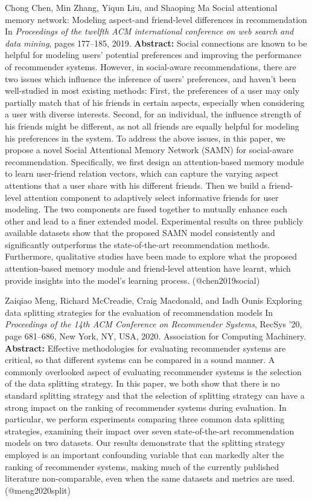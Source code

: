 \documentclass{article}
\begin{document}
\begin{thebibliography}{}
 Chong Chen, Min Zhang, Yiqun Liu, and Shaoping Ma \newblock Social attentional memory network: Modeling aspect-and friend-level differences in recommendation \newblock In {\em Proceedings of the twelfth ACM international conference on web search and data mining}, pages 177--185, 2019. \newblock \textbf{Abstract:} Social connections are known to be helpful for modeling users' potential preferences and improving the performance of recommender systems. However, in social-aware recommendations, there are two issues which influence the inference of users' preferences, and haven't been well-studied in most existing methods: First, the preferences of a user may only partially match that of his friends in certain aspects, especially when considering a user with diverse interests. Second, for an individual, the influence strength of his friends might be different, as not all friends are equally helpful for modeling his preferences in the system. To address the above issues, in this paper, we propose a novel Social Attentional Memory Network (SAMN) for social-aware recommendation. Specifically, we first design an attention-based memory module to learn user-friend relation vectors, which can capture the varying aspect attentions that a user share with his different friends. Then we build a friend-level attention component to adaptively select informative friends for user modeling. The two components are fused together to mutually enhance each other and lead to a finer extended model. Experimental results on three publicly available datasets show that the proposed SAMN model consistently and significantly outperforms the state-of-the-art recommendation methods. Furthermore, qualitative studies have been made to explore what the proposed attention-based memory module and friend-level attention have learnt, which provide insights into the model's learning process. \newblock (@chen2019social)

 Zaiqiao Meng, Richard McCreadie, Craig Macdonald, and Iadh Ounis \newblock Exploring data splitting strategies for the evaluation of recommendation models \newblock In {\em Proceedings of the 14th ACM Conference on Recommender Systems}, RecSys '20, page 681–686, New York, NY, USA, 2020. Association for Computing Machinery. \newblock \textbf{Abstract:} Effective methodologies for evaluating recommender systems are critical, so that different systems can be compared in a sound manner. A commonly overlooked aspect of evaluating recommender systems is the selection of the data splitting strategy. In this paper, we both show that there is no standard splitting strategy and that the selection of splitting strategy can have a strong impact on the ranking of recommender systems during evaluation. In particular, we perform experiments comparing three common data splitting strategies, examining their impact over seven state-of-the-art recommendation models on two datasets. Our results demonstrate that the splitting strategy employed is an important confounding variable that can markedly alter the ranking of recommender systems, making much of the currently published literature non-comparable, even when the same datasets and metrics are used. \newblock (@meng2020split)


\end{thebibliography}
\end{document}

